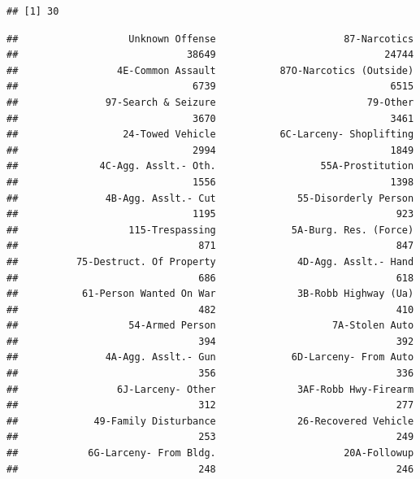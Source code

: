 \documentclass[12pt,]{book}
\newenvironment{Shaded}{\begin{snugshade}}{\end{snugshade}}
\newcommand{\KeywordTok}[1]{\textcolor[rgb]{0.13,0.29,0.53}{\textbf{#1}}}
\newcommand{\CommentTok}[1]{\textcolor[rgb]{0.56,0.35,0.01}{\textit{#1}}}
\newcommand{\OperatorTok}[1]{\textcolor[rgb]{0.81,0.36,0.00}{\textbf{#1}}}
\newcommand{\NormalTok}[1]{#1}
\theoremstyle{definition}
\theoremstyle{definition}
\theoremstyle{remark}
\begin{document}
\begin{verbatim}
## [1] 30
\end{verbatim}

\begin{Shaded}
\end{Shaded}

\begin{verbatim}
##                   Unknown Offense                      87-Narcotics 
##                             38649                             24744 
##                 4E-Common Assault           87O-Narcotics (Outside) 
##                              6739                              6515 
##               97-Search & Seizure                          79-Other 
##                              3670                              3461 
##                  24-Towed Vehicle           6C-Larceny- Shoplifting 
##                              2994                              1849 
##              4C-Agg. Asslt.- Oth.                  55A-Prostitution 
##                              1556                              1398 
##               4B-Agg. Asslt.- Cut              55-Disorderly Person 
##                              1195                               923 
##                   115-Trespassing             5A-Burg. Res. (Force) 
##                               871                               847 
##          75-Destruct. Of Property              4D-Agg. Asslt.- Hand 
##                               686                               618 
##           61-Person Wanted On War              3B-Robb Highway (Ua) 
##                               482                               410 
##                   54-Armed Person                    7A-Stolen Auto 
##                               394                               392 
##               4A-Agg. Asslt.- Gun             6D-Larceny- From Auto 
##                               356                               336 
##                 6J-Larceny- Other              3AF-Robb Hwy-Firearm 
##                               312                               277 
##             49-Family Disturbance              26-Recovered Vehicle 
##                               253                               249 
##            6G-Larceny- From Bldg.                      20A-Followup 
##                               248                               246 

\end{verbatim}
\end{document}
